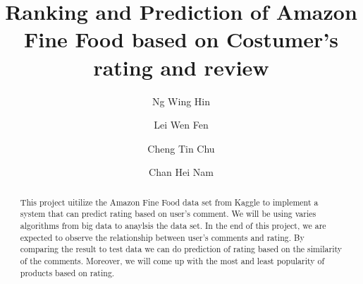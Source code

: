 \documentclass[sigconf]{acmart}
\begin{document}
\title{Ranking and Prediction of Amazon Fine Food based on Costumer's rating and review}

\author{Ng Wing Hin}

\author{Lei Wen Fen}

\author{Cheng Tin Chu}

\author{Chan Hei Nam}

\graphicspath{ {images/} }

\begin{abstract}
This project uitilize the Amazon Fine Food data set from Kaggle to implement a system that can predict rating based on user's comment. We will be using varies algorithms from big data to anaylsis the data set. In the end of this project, we are expected to observe the relationship between user's comments and rating. By comparing the result to test data we can do prediction of rating based on the similarity of the comments. Moreover, we will come up with the most and least popularity of products based on rating.
\end{abstract}
\maketitle



%
% 
\end{document}
